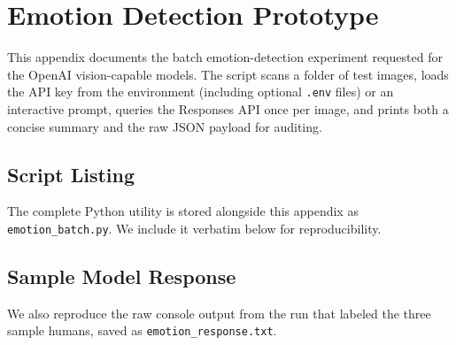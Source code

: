 \chapter{Emotion Detection Prototype}
\label{appendix:emotion-detection}

This appendix documents the batch emotion-detection experiment requested for the OpenAI vision-capable models. The script scans a folder of test images, loads the API key from the environment (including optional \texttt{.env} files) or an interactive prompt, queries the Responses API once per image, and prints both a concise summary and the raw JSON payload for auditing.

\section{Script Listing}

The complete Python utility is stored alongside this appendix as \texttt{emotion\_batch.py}. We include it verbatim below for reproducibility.



\section{Sample Model Response}

We also reproduce the raw console output from the run that labeled the three sample humans, saved as \texttt{emotion\_response.txt}.


